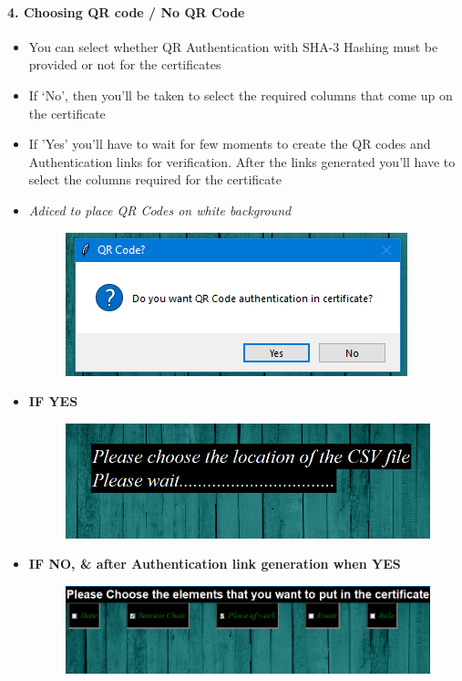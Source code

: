 \newpage
\paragraph{4. Choosing QR code / No QR Code}
\begin{itemize}
	\item You can select whether QR Authentication with SHA-3 Hashing must be provided or not for the certificates
	\item If `No', then you'll be taken to select the required columns that come up on the certificate
	\item If 'Yes' you'll have to wait for few moments to create the QR codes and Authentication links for verification. After the links generated you'll have to select the columns required for the certificate
	\item \textit{Adiced to place QR Codes on white background}


\begin{figure}[H]
	\centering
	\includegraphics[width=0.6\linewidth]{"images/generation_qr_nqr/Screenshot (39)"}
	\label{fig:screenshot-39}
\end{figure}

	\item \large\textbf{IF YES}

\begin{figure}[H]
	\centering
	\includegraphics[width=0.7\linewidth]{"images/generation_qr_nqr/Screenshot (51)"}
	\label{fig:screenshot-51}
\end{figure}

	\item \large\textbf{IF NO, \& after Authentication link generation when YES}
	
\begin{figure}[H]
	\centering
	\includegraphics[width=0.7\linewidth]{"images/generation_qr_nqr/Screenshot (41)"}
	\label{fig:screenshot-41}
\end{figure}


\end{itemize}

